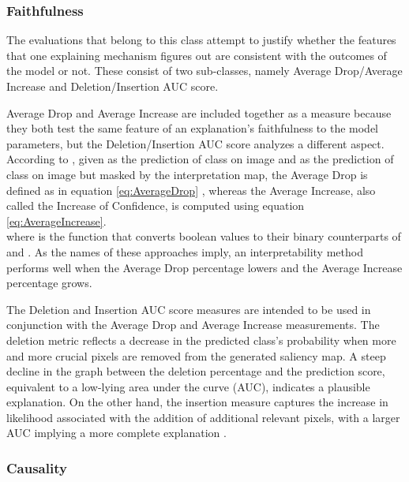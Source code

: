 \documentclass{svproc}
\begin{document}
\subsubsection{Faithfulness}

The evaluations that belong to this class attempt to justify whether the features that one explaining mechanism figures out are consistent with the outcomes of the model or not. These consist of two sub-classes, namely Average Drop/Average Increase and Deletion/Insertion AUC score. 

Average Drop and Average Increase are included together as a measure because they both test the same feature of an explanation's faithfulness to the model parameters, but the Deletion/Insertion AUC score analyzes a different aspect. According to \cite{chattopadhay2018grad}, given  as the prediction of class  on image  and  as the prediction of class  on image  but masked by the interpretation map, the Average Drop is defined as in equation \ref{eq:AverageDrop} \cite{wang2020score}, whereas the Average Increase, also called the Increase of Confidence, is computed using equation \ref{eq:AverageIncrease}. \\


where  is the function that converts boolean values to their binary counterparts of  and . As the names of these approaches imply, an interpretability method performs well when the Average Drop percentage lowers and the Average Increase percentage grows.

The Deletion and Insertion AUC score measures are intended to be used in conjunction with the Average Drop and Average Increase measurements. The deletion metric reflects a decrease in the predicted class's probability when more and more crucial pixels are removed from the generated saliency map. A steep decline in the graph between the deletion percentage and the prediction score, equivalent to a low-lying area under the curve (AUC), indicates a plausible explanation. On the other hand, the insertion measure captures the increase in likelihood associated with the addition of additional relevant pixels, with a larger AUC implying a more complete explanation \cite{wang2020score}.

\subsubsection{Causality}
\end{document}
